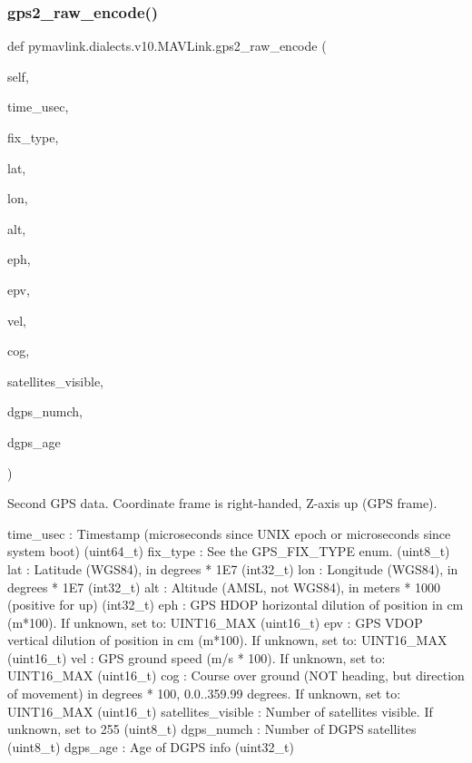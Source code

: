 \begin{DoxyVerb}
\begin{DoxyVerb}
\subsubsection{\texorpdfstring{gps2\+\_\+raw\+\_\+encode()}{gps2\_raw\_encode()}}
{\footnotesize\ttfamily def pymavlink.\+dialects.\+v10.\+M\+A\+V\+Link.\+gps2\+\_\+raw\+\_\+encode (\begin{DoxyParamCaption}\item[{}]{self,  }\item[{}]{time\+\_\+usec,  }\item[{}]{fix\+\_\+type,  }\item[{}]{lat,  }\item[{}]{lon,  }\item[{}]{alt,  }\item[{}]{eph,  }\item[{}]{epv,  }\item[{}]{vel,  }\item[{}]{cog,  }\item[{}]{satellites\+\_\+visible,  }\item[{}]{dgps\+\_\+numch,  }\item[{}]{dgps\+\_\+age }\end{DoxyParamCaption})}

\begin{DoxyVerb}Second GPS data. Coordinate frame is right-handed, Z-axis up (GPS
frame).

time_usec                 : Timestamp (microseconds since UNIX epoch or microseconds since system boot) (uint64_t)
fix_type                  : See the GPS_FIX_TYPE enum. (uint8_t)
lat                       : Latitude (WGS84), in degrees * 1E7 (int32_t)
lon                       : Longitude (WGS84), in degrees * 1E7 (int32_t)
alt                       : Altitude (AMSL, not WGS84), in meters * 1000 (positive for up) (int32_t)
eph                       : GPS HDOP horizontal dilution of position in cm (m*100). If unknown, set to: UINT16_MAX (uint16_t)
epv                       : GPS VDOP vertical dilution of position in cm (m*100). If unknown, set to: UINT16_MAX (uint16_t)
vel                       : GPS ground speed (m/s * 100). If unknown, set to: UINT16_MAX (uint16_t)
cog                       : Course over ground (NOT heading, but direction of movement) in degrees * 100, 0.0..359.99 degrees. If unknown, set to: UINT16_MAX (uint16_t)
satellites_visible        : Number of satellites visible. If unknown, set to 255 (uint8_t)
dgps_numch                : Number of DGPS satellites (uint8_t)
dgps_age                  : Age of DGPS info (uint32_t)\end{DoxyVerb}
 \mbox{\label{classpymavlink_1_1dialects_1_1v10_1_1MAVLink_ad6cd4b0f732166f4697d1d4f684aa435}} 

\end{DoxyVerb}
\end{DoxyVerb}

